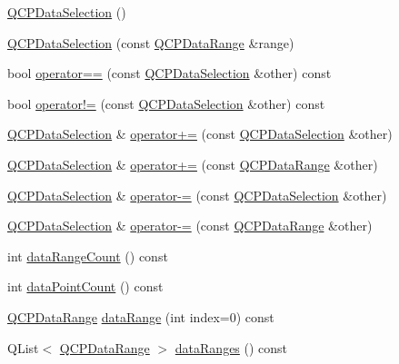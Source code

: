 \begin{DoxyCompactItemize}
\item 
\hyperlink{class_q_c_p_data_selection_a0e0b7faaec7df1a7c77dd6f4883cdf0d}{Q\+C\+P\+Data\+Selection} ()
\item 
\hyperlink{class_q_c_p_data_selection_a738dfb4f5718c5df5ed35ea33ac37818}{Q\+C\+P\+Data\+Selection} (const \hyperlink{class_q_c_p_data_range}{Q\+C\+P\+Data\+Range} \&range)
\item 
bool \hyperlink{class_q_c_p_data_selection_a664fa566569b17148abafd6b1dbbf347}{operator==} (const \hyperlink{class_q_c_p_data_selection}{Q\+C\+P\+Data\+Selection} \&other) const
\item 
bool \hyperlink{class_q_c_p_data_selection_a8324733cc88660ee4792ee60d6a4520c}{operator!=} (const \hyperlink{class_q_c_p_data_selection}{Q\+C\+P\+Data\+Selection} \&other) const
\item 
\hyperlink{class_q_c_p_data_selection}{Q\+C\+P\+Data\+Selection} \& \hyperlink{class_q_c_p_data_selection_a4584d4b0ea5c4f095bd7b70f88eb5d9d}{operator+=} (const \hyperlink{class_q_c_p_data_selection}{Q\+C\+P\+Data\+Selection} \&other)
\item 
\hyperlink{class_q_c_p_data_selection}{Q\+C\+P\+Data\+Selection} \& \hyperlink{class_q_c_p_data_selection_a17058640d4e6f49984a0e7e42043df1b}{operator+=} (const \hyperlink{class_q_c_p_data_range}{Q\+C\+P\+Data\+Range} \&other)
\item 
\hyperlink{class_q_c_p_data_selection}{Q\+C\+P\+Data\+Selection} \& \hyperlink{class_q_c_p_data_selection_a66f9fab70b026baa64bf8e52fe5de07e}{operator-\/=} (const \hyperlink{class_q_c_p_data_selection}{Q\+C\+P\+Data\+Selection} \&other)
\item 
\hyperlink{class_q_c_p_data_selection}{Q\+C\+P\+Data\+Selection} \& \hyperlink{class_q_c_p_data_selection_a8d18b20d20dde737eefc10967e31cf73}{operator-\/=} (const \hyperlink{class_q_c_p_data_range}{Q\+C\+P\+Data\+Range} \&other)
\item 
int \hyperlink{class_q_c_p_data_selection_abd8869ccb231ab991e8576de931f647d}{data\+Range\+Count} () const
\item 
int \hyperlink{class_q_c_p_data_selection_ac9e74dd294778aa799216c3435c9c4f0}{data\+Point\+Count} () const
\item 
\hyperlink{class_q_c_p_data_range}{Q\+C\+P\+Data\+Range} \hyperlink{class_q_c_p_data_selection_a6956acf6a9a49a353b4f9b58608978ad}{data\+Range} (int index=0) const
\item 
Q\+List$<$ \hyperlink{class_q_c_p_data_range}{Q\+C\+P\+Data\+Range} $>$ \hyperlink{class_q_c_p_data_selection_ac3b1c5e7713d380cd9e447f4556b94da}{data\+Ranges} () const

\end{DoxyCompactItemize}
